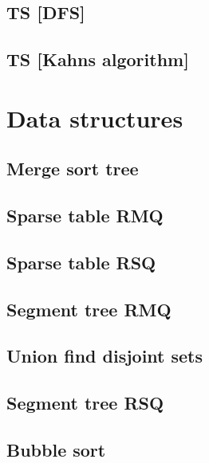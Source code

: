 \subsection{TS [DFS]}
\raggedbottom
\hrulefill
\subsection{TS [Kahns algorithm]}
\raggedbottom
\hrulefill


\section{Data structures}
\subsection{Merge sort tree}
\raggedbottom
\hrulefill
\subsection{Sparse table RMQ}
\raggedbottom
\hrulefill
\subsection{Sparse table RSQ}
\raggedbottom
\hrulefill
\subsection{Segment tree RMQ}
\raggedbottom
\hrulefill
\subsection{Union find disjoint sets}
\raggedbottom
\hrulefill
\subsection{Segment tree RSQ}
\raggedbottom
\hrulefill
\subsection{Bubble sort}
\raggedbottom
\hrulefill
